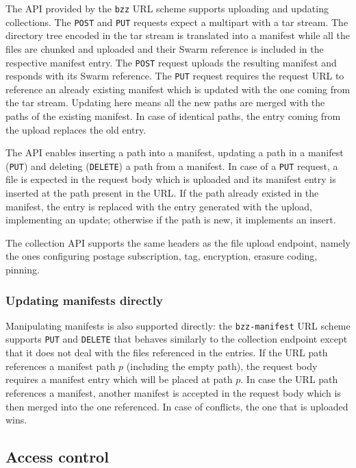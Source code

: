The API provided by the \lstinline{bzz} URL scheme supports uploading and updating collections. The \lstinline{POST} and \lstinline{PUT} requests expect a multipart with a tar stream. The directory tree encoded in the tar stream is translated into a manifest while all the files are chunked and uploaded and their Swarm reference is included in the respective manifest entry. The \lstinline{POST} request uploads the resulting manifest and responds with its Swarm reference. The \lstinline{PUT} request requires the request URL to reference an already existing manifest which is updated with the one coming from the tar stream. Updating here means all the new paths are merged with the paths of the existing manifest. In case of identical paths, the entry coming from the upload replaces the old entry.

The API enables inserting a path into a manifest, updating a path in a manifest (\lstinline{PUT}) and deleting (\lstinline{DELETE}) a path from a manifest. In case of a \lstinline{PUT} request, a file is expected in the request body which is uploaded and its manifest entry is inserted at the path present in the URL. If the path already existed in the manifest, the entry is replaced with the entry generated with the upload, implementing an update; otherwise if the path is new, it implements an insert. 

The collection API supports the same headers as the file upload endpoint, namely the ones configuring postage subscription, tag, encryption, erasure coding, pinning.

\subsubsection{Updating manifests directly}

Manipulating manifests is also supported directly: the \lstinline{bzz-manifest} URL scheme supports \lstinline{PUT} and \lstinline{DELETE} that behaves similarly to the collection endpoint except that it does not deal with the files referenced in the entries. If the URL path references a manifest path $p$ (including the empty path), the request body requires a manifest entry which will be placed at path $p$. In case the URL path references a manifest, another manifest is accepted in the request body which is then merged into the one referenced. In case of conflicts, the one that is uploaded wins. 


\subsection{Access control \statusgreen}\label{sec:access-control-ux}

